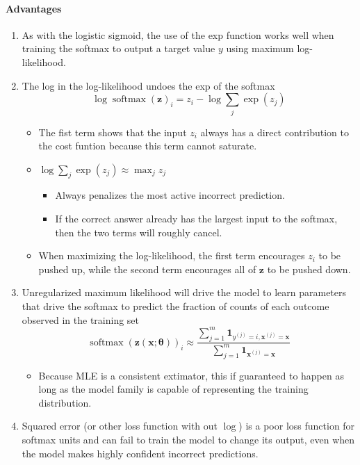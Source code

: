 \documentclass[12pt, a4paper]{article}
\def\vx{\boldsymbol{x}}
\def\vz{\boldsymbol{z}}
\def\v1{\boldsymbol{1}}
\def\vtheta{\boldsymbol{\theta}}
\DeclareMathOperator*{\softmax}{softmax}
\newcommand{\egvx}[1]{\boldsymbol{x}^{(#1)}}
\newcommand{\egy}[1]{y^{(#1)}}
\begin{document}
\paragraph{Advantages}
\begin{enumerate}
    \item As with the logistic sigmoid, the use of the exp function works well when training the softmax to output a target value $y$ using maximum log-likelihood.
    \item The log in the log-likelihood undoes the exp of the softmax
        \[
            \log \softmax(\vz)_i = z_i - \log \sum_j \exp(z_j)
        \]
        \begin{itemize}
            \item The fist term shows that the input $z_i$ always has a direct contribution to the cost funtion because this term cannot saturate.
            \item $\log \sum_j \exp(z_j) \approx \max_j z_j$
                \begin{itemize}
                    \item Always penalizes the most active incorrect prediction.
                    \item If the correct answer already has the largest input to the softmax, then the two terms will roughly cancel.
                \end{itemize}
            \item When maximizing the log-likelihood, the first term encourages $z_i$ to be pushed up, while the second term encourages all of $\vz$ to be pushed down.
        \end{itemize}
    \item Unregularized maximum likelihood will drive the model to learn parameters that drive the softmax to predict the fraction of counts of each outcome observed in the training set
        \[
            \softmax(\vz(\vx;\vtheta))_i \approx \frac{\sum_{j=1}^m \v1_{\egy{j}=i, \egvx{j}=\vx}}{\sum_{j=1}^m \v1_{\egvx{j}=\vx}}
        \]
        \begin{itemize}
            \item Because MLE is a consistent extimator, this if guaranteed to happen as long as the model family is capable of representing the training distribution.
        \end{itemize}
    \item Squared error (or other loss function with out $\log$) is a poor loss function for softmax units and can fail to train the model to change its output, even when the model makes highly confident incorrect predictions.

\end{enumerate}
\end{document}
